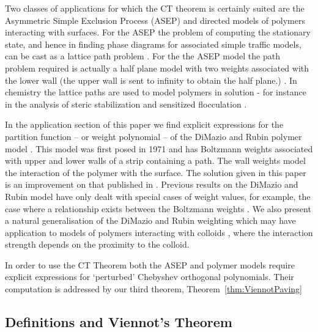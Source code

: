 \documentclass[11pt,a4paper]{article}
\begin{document}
  
Two classes of  applications for which  the CT theorem   is certainly suited are the Asymmetric Simple Exclusion Process (ASEP) and directed models of polymers interacting with surfaces.  For the ASEP the problem of computing the stationary state,  and hence in finding phase diagrams for associated simple traffic models, can be cast as a lattice path problem \cite{blythe:2007yq,blythe:2000ru, blythe:ai,  brak:2006fj, Brak2004vf,Corteel05ve, derrida97, evans:1999cr}. For the  the ASEP model  the path problem required is actually a half plane model with two weights associated with the lower wall (the upper wall is sent to infinity to obtain the half plane.) \cite{Brak2004vf}.  
In chemistry the lattice  paths are used to model polymers in solution \cite{gennes79} - for instance in the analysis of steric stabilization and  sensitized flocculation  \cite{brak:2007lr,brak:2005fa}. 

In the application section of this paper we find   explicit expressions for the partition function -- or weight polynomial -- of the DiMazio and Rubin polymer model \cite{dimarzio:1971ev}. This model was first posed in 1971  and has    Boltzmann weights   associated with upper and lower walls of a strip containing a path. The wall weights model the interaction of the polymer with the surface.  The solution given in this paper is an improvement on that published in \cite{brak:2006kx}. Previous results on the DiMazio and Rubin model have only dealt with special cases of weight values, for example, the case  where a  relationship exists between the Boltzmann weights \cite{brak:1999ri}.   We also present a natural generalisation of the DiMazio and Rubin weighting which may have application to models of polymers interacting with colloids \cite{owczarek:2007yq}, where the interaction strength depends on the proximity to the colloid. 

In order to use the CT Theorem both the ASEP and polymer models require explicit expressions for  `perturbed' Chebyshev orthogonal  polynomials. Their computation is addressed by  our third theorem, Theorem~\ref{thm:ViennotPaving}




\subsection{Definitions and Viennot's Theorem} %
\label{sec:definitions_and_viennots_theorem}
\end{document}
